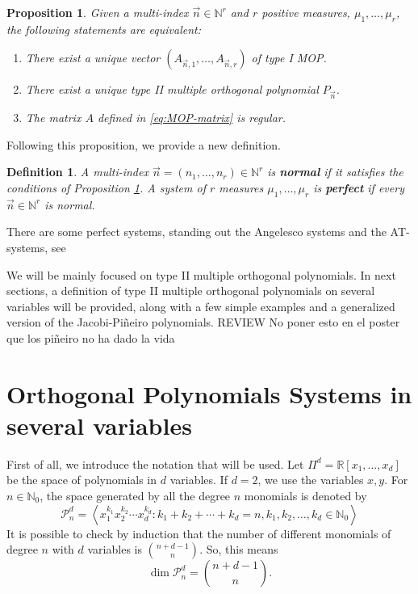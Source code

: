 \documentclass[12pt,a4]{report}
\theoremstyle{plain}
\newtheorem{proposition}[theorem]{Proposition}
\newtheorem{definition}[theorem]{Definition}
\newcommand{\R}[0]{\mathbb{R}}
\newcommand{\N}[0]{\mathbb{N}}
\newcommand{\cred}[1]{{\color{red} #1}}
\begin{document}
\begin{proposition}
    \label{prop:existence-of-MOP}
    Given a multi-index $\vec n\in\N^r$ and $r$ positive measures, $\mu_1,\dots,\mu_r$, the following statements are equivalent:
    \begin{enumerate}
        \item There exist a unique vector $(A_{\vec n,1}, \dots, A_{\vec n,r})$ of type I MOP.
        \item There exist a unique type II multiple orthogonal polynomial $P_{\vec n}$.
        \item The matrix $A$ defined in \eqref{eq:MOP-matrix} is regular.
    \end{enumerate}
\end{proposition}

Following this proposition, we provide a new definition.

\begin{definition}
    A multi-index $\vec n = (n_1,\dots,n_r)\in\N^r$ is \textbf{normal} if it satisfies the conditions of Proposition \ref{prop:existence-of-MOP}.
    A system of $r$ measures $\mu_1,\dots,\mu_r$ is \textbf{perfect} if every $\vec n\in\N^r$ is normal.
\end{definition}

There are some perfect systems, standing out the Angelesco systems and the AT-systems, see \cite[Sections 23.1.1 and 23.1.2]{Ismail}

We will be mainly focused on type II multiple orthogonal polynomials. In next sections, a definition of type II multiple orthogonal polynomials on several variables will be provided, along with a few simple examples and a generalized version of the Jacobi-Piñeiro polynomials. 
\cred{REVIEW No poner esto en el poster que los piñeiro no ha dado la vida}

\section*{Orthogonal Polynomials Systems in several variables}

First of all, we introduce the notation that will be used. Let $\Pi^d=\R[x_1,\dots,x_d]$ be the space of polynomials in $d$ variables. If $d=2$, we use the variables $x,y$. For $n\in\N_0$, the space generated by all the degree $n$ monomials is denoted by 
$$
\mathcal{P}_n^d = \left\langle x_1^{k_1} x_2^{k_2} \cdots x_d^{k_d}: k_1+k_2+\cdots +k_d = n, k_1,k_2,\dots,k_d\in\N_0\right\rangle
$$
It is possible to check by induction that the number of different monomials of degree $n$ with $d$ variables is $\displaystyle\binom{n+d-1}{n}$. So, this means
$$
\dim \mathcal{P}_n^d = \binom{n+d-1}{n}.
$$
\end{document}
